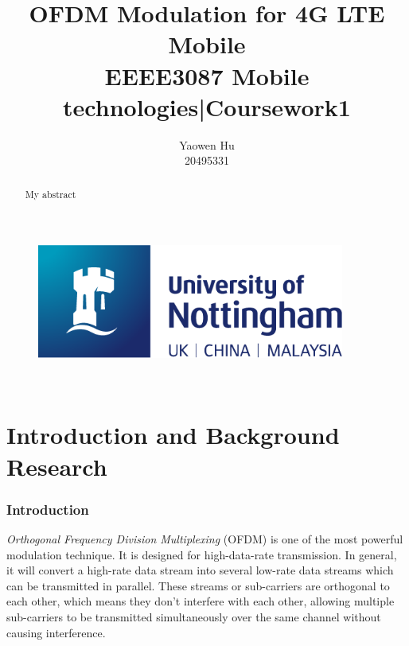 \documentclass{article}
\title{\vspace{20 pt}OFDM Modulation for 4G LTE Mobile\\{\small EEEE3087 Mobile technologies|Coursework1}\vspace{20 pt}}
\author{Yaowen Hu\\{\small 20495331}}
\date{}
\begin{document}

\begin{titlepage}
\begin{figure}
    \vspace{-4em}
    \centering
    \includegraphics[width=0.9\textwidth]{images/logo.png}
\end{figure}

\vfill
\maketitle
\vfill

\\
\vspace{10 pt}
\centering{\today}
\thispagestyle{empty}
\pagebreak
\end{titlepage}


\tableofcontents
\thispagestyle{empty}
\pagebreak


\begin{abstract}
My abstract
\setcounter{page}{1}
\thispagestyle{empty}
\pagebreak
\end{abstract}


\part{Introduction and Background Research}

\pagestyle{plain}
\setcounter{page}{1}

\section{Introduction}
\textit{Orthogonal Frequency Division Multiplexing} (OFDM) is one of the most powerful modulation technique. It is designed for high-data-rate transmission. In general, it will convert a high-rate data stream into several low-rate data streams which can be transmitted in parallel\cite{RN79}. These streams or sub-carriers are orthogonal to each other, which means they don't interfere with each other, allowing multiple sub-carriers to be transmitted simultaneously over the same channel without causing interference.
\end{document}
